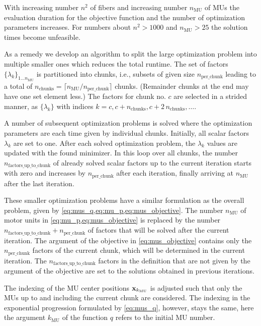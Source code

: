 With increasing number $n^2$ of fibers and increasing number $n_\text{MU}$ of MUs the evaluation duration for the objective function and the number of optimization parameters increases. For numbers about $n^2 > 1000$ and $n_\text{MU} > 25$ the solution times become unfeasible.

As a remedy we develop an algorithm to split the large optimization problem into multiple smaller ones which reduces the total runtime. 
The set of factors $\{\lambda_k\}_{1\dots n_\text{MU}}$ is partitioned into chunks, i.e., subsets of given size $n_\text{per\_chunk}$ leading to a total of $n_\text{chunks} = \lceil n_\text{MU} / n_\text{per\_chunk} \rceil$ chunks.
(Remainder chunks at the end may have one set element less.)
The factors for chunk no. $c$ are selected in a strided manner, as $\{\lambda_k\}$ with indices ${k=c, c+n_\text{chunks}, c+2\,n_\text{chunks}, \dots}$.

A number of subsequent optimization problems is solved where the optimization parameters are each time given by individual chunks.
Initially, all scalar factors $\lambda_k$ are set to one. After each solved optimization problem, the $\lambda_k$ values are updated with the found minimizer.
In this loop over all chunks, the number $n_\text{factors\_up\_to\_chunk}$ of already solved scalar factors up to the current iteration starts with zero and increases by $n_\text{per\_chunk}$ after each iteration, finally arriving at $n_\text{MU}$ after the last iteration.

These smaller optimization problems have a similar formulation as the overall problem, given by \cref{eq:mus_q,eq:mu_p,eq:mus_objective}. The number $n_\text{MU}$ of motor units in \cref{eq:mu_p,eq:mus_objective} is replaced by the number $n_\text{factors\_up\_to\_chunk}+n_\text{per\_chunk}$ of factors that will be solved after the current iteration. The argument of the objective in \cref{eq:mus_objective} contains only the $n_\text{per\_chunk}$ factors of the current chunk, which will be determined in the current iteration. The $n_\text{factors\_up\_to\_chunk}$ factors in the definition that are not given by the argument of the objective are set to the solutions obtained in previous iterations.

The indexing of the MU center positions $\textbf{x}_{k_\text{MU}}$ is adjusted such that only the MUs up to and including the current chunk are considered. The indexing in the exponential progression formulated by \cref{eq:mus_q}, however, stays the same, here the argument $k_\text{MU}$ of the function $q$ refers to the initial MU number.

